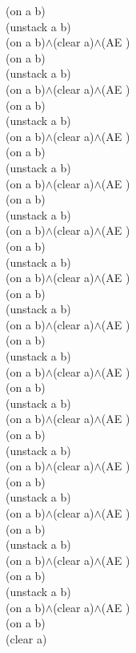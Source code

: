 {{(on a b)\\
(unstack a b)\\
(on a b)$\wedge$(clear a)$\wedge$(AE )\\
(on a b)\\
(unstack a b)\\
(on a b)$\wedge$(clear a)$\wedge$(AE )\\
(on a b)\\
(unstack a b)\\
(on a b)$\wedge$(clear a)$\wedge$(AE )\\
(on a b)\\
(unstack a b)\\
(on a b)$\wedge$(clear a)$\wedge$(AE )\\
(on a b)\\
(unstack a b)\\
(on a b)$\wedge$(clear a)$\wedge$(AE )\\
(on a b)\\
(unstack a b)\\
(on a b)$\wedge$(clear a)$\wedge$(AE )\\
(on a b)\\
(unstack a b)\\
(on a b)$\wedge$(clear a)$\wedge$(AE )\\
(on a b)\\
(unstack a b)\\
(on a b)$\wedge$(clear a)$\wedge$(AE )\\
(on a b)\\
(unstack a b)\\
(on a b)$\wedge$(clear a)$\wedge$(AE )\\
(on a b)\\
(unstack a b)\\
(on a b)$\wedge$(clear a)$\wedge$(AE )\\
(on a b)\\
(unstack a b)\\
(on a b)$\wedge$(clear a)$\wedge$(AE )\\
(on a b)\\
(unstack a b)\\
(on a b)$\wedge$(clear a)$\wedge$(AE )\\
(on a b)\\
(unstack a b)\\
(on a b)$\wedge$(clear a)$\wedge$(AE )\\
(on a b)\\
(clear a)\\
}%
}

